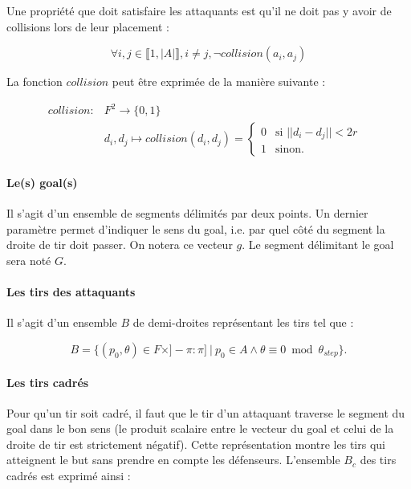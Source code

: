 \documentclass[12pt]{article}
\begin{document}
Une propriété que doit satisfaire les attaquants est qu'il ne doit pas y avoir de collisions lors de leur placement :

\begin{equation*}
\forall i, j \in \llbracket 1, |A| \rrbracket, i \ne j, \neg collision(a_i, a_j)
\end{equation*}

La fonction $collision$ peut être exprimée de la manière suivante :

\begin{align*}
  collision \colon &F^2 \to \{0, 1 \}\\
  &d_i, d_j \mapsto collision(d_i, d_j) = \begin{cases}
                                   0 & \text{si $|| d_i - d_j || < 2r$ } \\
                                   1 & \text{sinon.}
  \end{cases}
\end{align*}

\paragraph{Le(s) goal(s)} Il s'agit d'un ensemble de segments délimités par deux points. Un dernier paramètre permet d'indiquer le sens du goal, i.e. par quel \og côté \fg{} du segment la droite de tir doit passer. On notera ce vecteur $g$. Le segment délimitant le goal sera noté $G$.

\paragraph{Les tirs des attaquants} Il s'agit d'un ensemble $B$ de demi-droites représentant les tirs tel que :

\begin{equation*}
    B = \{ (p_0, \theta) \in F \times ]-\pi: \pi] \ | \ p_0 \in A \wedge \theta \equiv 0 \bmod \theta_{step} \}.
\end{equation*}

\paragraph{Les tirs cadrés}
Pour qu'un tir soit cadré, il faut que le tir d'un attaquant traverse le segment du goal dans le bon sens (le produit scalaire entre le vecteur du goal et celui de la droite de tir est strictement négatif). Cette représentation montre les tirs qui atteignent le but sans prendre en compte les défenseurs. L'ensemble $B_c$ des tirs cadrés est exprimé ainsi :
\end{document}

